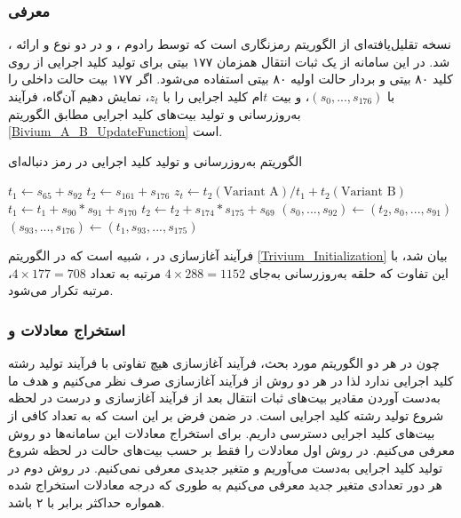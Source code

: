 \subsubsection*{معرفی }
، 
نسخه تقلیل‌یافته‌ای از الگوریتم رمزنگاری 
است که توسط  رادوم
\cite{raddum2006cryptanalytic}، 
و در  دو نوع 
و
ارائه شد. در این سامانه از یک ثبات انتقال همزمان ۱۷۷ بیتی برای تولید کلید اجرایی از روی کلید ۸۰ بیتی و بردار حالت اولیه ۸۰ بیتی استفاده می‌شود. اگر ۱۷۷ بیت حالت داخلی را با 
$(s_{0},...,s_{176})$، 
و بیت 
$t$ام
کلید اجرایی را با 
$z_{t}$، 
نمایش دهیم آن‌گاه،  فرآیند به‌روزرسانی و تولید بیت‌های کلید اجرایی مطابق الگوریتم 
\ref{Bivium_A_B_UpdateFunction}
است. 
\begin{algorithm}
\caption{الگوریتم به‌روزرسانی و تولید کلید اجرایی در رمز دنباله‌ای 
		}
\label{Bivium_A_B_UpdateFunction}	
	\begin{latin}
		\begin{algorithmic}[]						
			\STATE $t_{1} \gets s_{65} + s_{92}$
			\STATE $t_{2} \gets s_{161} + s_{176}$
			\STATE $z_{t} \gets t_{2} (\text{Variant A}) / t_{1} + t_{2} (\text{Variant B})$
			\STATE $t_{1} \gets t_{1} + s_{90}*s_{91} + s_{170}$
			\STATE $t_{2} \gets t_{2} + s_{174}*s_{175} + s_{69}$
			\STATE $(s_{0},...,s_{92}) \gets (t_{2}, s_{0},...,s_{91})$
			\STATE $(s_{93},...,s_{176}) \gets (t_{1}, s_{93},...,s_{175})$
			\ENDFOR
		\end{algorithmic}
	\end{latin}
\end{algorithm}

فرآیند آغازسازی در 
، 
شبیه 
است که در الگوریتم 
\ref{Trivium_Initialization}
بیان شد، با این تفاوت که حلقه‌  به‌روزرسانی به‌جای
$4\times 288 = 1152$
مرتبه به تعداد 
$4\times177 = 708$، 
مرتبه تکرار می‌شود. 

\subsubsection*{استخراج معادلات   و }
چون در هر دو الگوریتم مورد بحث، فرآیند آغازسازی هیچ تفاوتی با فرآیند تولید رشته کلید اجرایی ندارد لذا  در هر دو روش  از فرآیند آغازسازی صرف‌ نظر می‌کنیم و هدف ما به‌دست آوردن مقادیر بیت‌های ثبات انتقال بعد از فرآیند آغازسازی و درست در لحظه شروع  تولید رشته کلید اجرایی است. در ضمن فرض بر این است که به تعداد کافی از بیت‌های کلید اجرایی دسترسی داریم.  برای استخراج معادلات این سامانه‌ها دو روش معرفی می‌کنیم. در روش اول معادلات را فقط بر حسب بیت‌های حالت در لحظه شروع تولید کلید اجرایی‌ به‌دست می‌آوریم و متغیر جدیدی معرفی نمی‌کنیم. در روش دوم در هر دور تعدادی متغیر جدید معرفی می‌کنیم به طوری که درجه معادلات استخراج شده همواره حداکثر برابر با ۲ باشد. 

